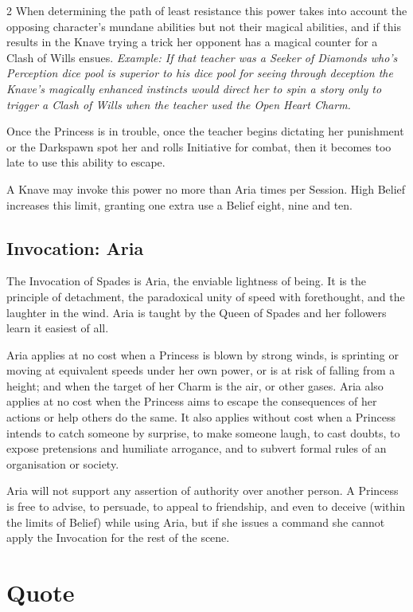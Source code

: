 \begin{multicols}{2}
When determining the path of least resistance this power takes into account the opposing character's mundane abilities but not their magical abilities, and if this results in the Knave trying a trick her opponent has a magical counter for a Clash of Wills ensues. \textit{Example: If that teacher was a Seeker of Diamonds who's Perception dice pool is superior to his dice pool for seeing through deception the Knave's magically enhanced instincts would direct her to spin a story only to trigger a Clash of Wills when the teacher used the Open Heart Charm.}

Once the Princess is in trouble, once the teacher begins dictating her punishment or the Darkspawn spot her and rolls Initiative for combat, then it becomes too late to use this ability to escape.

A Knave may invoke this power no more than Aria times per Session. High Belief increases this limit, granting one extra use a Belief eight, nine and ten.

\subsection*{Invocation: Aria}

The Invocation of Spades is Aria, the enviable lightness of being. It is the principle of detachment, the paradoxical unity of speed with forethought, and the laughter in the wind. Aria is taught by the Queen of Spades and her followers learn it easiest of all.

Aria applies at no cost when a Princess is blown by strong winds, is sprinting or moving at equivalent speeds under her own power, or is at risk of falling from a height; and when the target of her Charm is the air, or other gases. Aria also applies at no cost when the Princess aims to escape the consequences of her actions or help others do the same. It also applies without cost when a Princess intends to catch someone by surprise, to make someone laugh, to cast doubts, to expose pretensions and humiliate arrogance, and to subvert formal rules of an organisation or society.

Aria will not support any assertion of authority over another person. A Princess is free to advise, to persuade, to appeal to friendship, and even to deceive (within the limits of Belief) while using Aria, but if she issues a command she cannot apply the Invocation for the rest of the scene. %

\section*{Quote}


\end{multicols}
